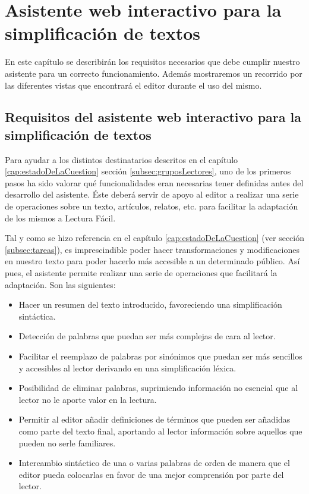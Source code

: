 \chapter{Asistente web interactivo para la simplificación de textos}
\label{cap:asistenteWeb}



En este capítulo se describirán los requisitos necesarios que debe cumplir nuestro asistente para un correcto funcionamiento. Además mostraremos un recorrido por las diferentes vistas que encontrará el editor durante el uso del mismo.



\section{Requisitos del asistente web interactivo para la simplificación de textos}

Para ayudar a los distintos destinatarios descritos en el capítulo \ref{cap:estadoDeLaCuestion} sección \ref{subsec:gruposLectores}, uno de los primeros pasos ha sido valorar qué funcionalidades eran necesarias tener definidas antes del desarrollo del asistente. Éste deberá servir de apoyo al editor a realizar una serie de operaciones sobre un texto, artículos, relatos, etc. para facilitar la adaptación de los mismos a Lectura Fácil.

Tal y como se hizo referencia en el capítulo \ref{cap:estadoDeLaCuestion} (ver sección \ref{subsec:tareas}), es imprescindible poder hacer transformaciones y modificaciones en nuestro texto para poder hacerlo más accesible a un determinado público. Así pues, el asistente permite realizar una serie de operaciones que facilitará la adaptación. Son las siguientes:

\begin{itemize}
	
	\item Hacer un resumen del texto introducido, favoreciendo una simplificación sintáctica.
	\item  Detección de palabras que puedan ser más complejas de cara al lector.
	\item Facilitar el reemplazo de palabras por sinónimos que puedan ser más sencillos y accesibles al lector derivando en una simplificación léxica.
	\item Posibilidad de eliminar palabras, suprimiendo información no esencial que al lector no le aporte valor en la lectura.
	\item Permitir al editor añadir definiciones de términos que pueden ser añadidas como parte del texto final, aportando al lector información sobre aquellos que pueden no serle familiares.
	\item  Intercambio sintáctico de una o varias palabras de orden de manera que el editor pueda colocarlas en favor de una mejor comprensión por parte del lector.
\end{itemize}

